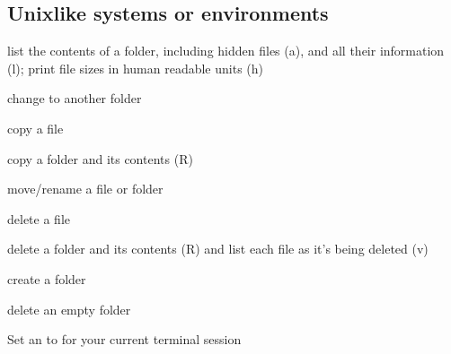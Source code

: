 \subsection{Unix\sphinxhyphen{}like systems or environments}
\label{\detokenize{intro/howto:unix-like-systems-or-environments}}\label{\detokenize{intro/howto:index-2}}\begin{description}
\sphinxAtStartPar
list the contents of a folder, including hidden files (\sphinxhyphen{}a), and all their information (\sphinxhyphen{}l);
print file sizes in human readable units (\sphinxhyphen{}h)

\sphinxAtStartPar
change to another folder

\sphinxAtStartPar
copy a file

\sphinxAtStartPar
copy a folder and its contents (\sphinxhyphen{}R)

\sphinxAtStartPar
move/rename a file or folder

\sphinxAtStartPar
delete a file

\sphinxAtStartPar
delete a folder and its contents (\sphinxhyphen{}R) and list each file as it’s being deleted (\sphinxhyphen{}v)

\sphinxAtStartPar
create a folder

\sphinxAtStartPar
delete an empty folder

\sphinxAtStartPar
Set an {\hyperref[\detokenize{glossary:term-environment-variable}]{}}  to  for your current terminal session

\end{description}

